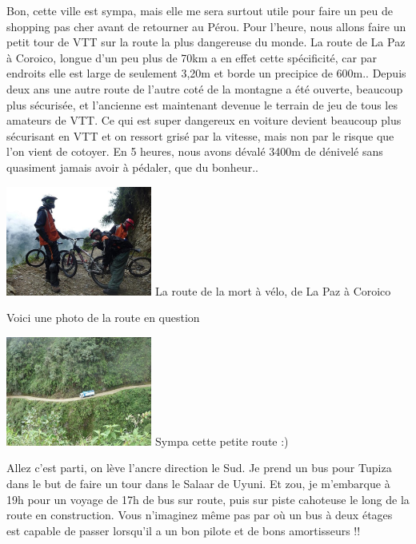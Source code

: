 \begin{multicols}{2}
Bon, cette ville est sympa, mais elle me sera surtout utile pour faire un peu de shopping pas cher avant de retourner au Pérou. Pour l'heure, nous allons faire un petit tour de VTT sur la route la plus dangereuse du monde. La route de La Paz à Coroico, longue d'un peu plus de 70km a en effet cette spécificité, car par endroits elle est large de seulement 3,20m et borde un precipice de 600m.. Depuis deux ans une autre route de l'autre coté de la montagne a été ouverte, beaucoup plus sécurisée, et l'ancienne est maintenant devenue le terrain de jeu de tous les amateurs de VTT. Ce qui est super dangereux en voiture devient beaucoup plus sécurisant en VTT et on ressort grisé par la vitesse, mais non par le risque que l'on vient de cotoyer. En 5 heures, nous avons dévalé 3400m de dénivelé sans quasiment jamais avoir à pédaler, que du bonheur..

\hspace*{-0.65cm}
\includegraphics[width=4.8cm]{articles/La-paz-humahuaca-et-salaar/1257387311RBTU.jpg}
La route de la mort à vélo, de La Paz à Coroico

Voici une photo de la route en question

\hspace*{-0.65cm}
\includegraphics[width=4.8cm]{articles/La-paz-humahuaca-et-salaar/1257387218mz18.jpg}
Sympa cette petite route :)

Allez c'est parti, on lève l'ancre direction le Sud. Je prend un bus pour Tupiza dans le but de faire un tour dans le Salaar de Uyuni. Et zou, je m'embarque à 19h pour un voyage de 17h de bus sur route, puis sur piste cahoteuse le long de la route en construction. Vous n'imaginez même pas par où un bus à deux étages est capable de passer lorsqu'il a un bon pilote et de bons amortisseurs !!


\end{multicols}
